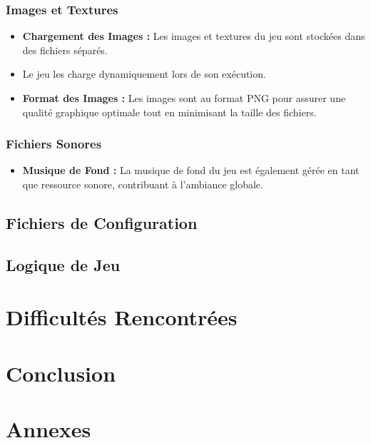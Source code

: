 \documentclass{article}
\begin{document}
    \subsubsection*{Images et Textures}

    \begin{itemize}
        \item \textbf{Chargement des Images :} Les images et textures du jeu sont stockées dans des fichiers séparés.

        \item Le jeu les charge dynamiquement lors de son exécution.

        \item \textbf{Format des Images :} Les images sont au format PNG pour assurer une qualité graphique optimale tout en minimisant la taille des fichiers.
    \end{itemize}

    \subsubsection*{Fichiers Sonores}

    \begin{itemize}
        \item \textbf{Musique de Fond :} La musique de fond du jeu est également gérée en tant que ressource sonore, contribuant à l'ambiance globale.
    \end{itemize}

    \subsection{Fichiers de Configuration}\label{subsec:fichiers-de-configuration}


    \subsection{Logique de Jeu}\label{subsec:logique-de-jeu}

    \section{Difficultés Rencontrées}\label{sec:difficultes-rencontrees}

    \section{Conclusion}\label{sec:conclusion}

    \section{Annexes}\label{sec:annexes}



    \tableofcontents
\end{document}
